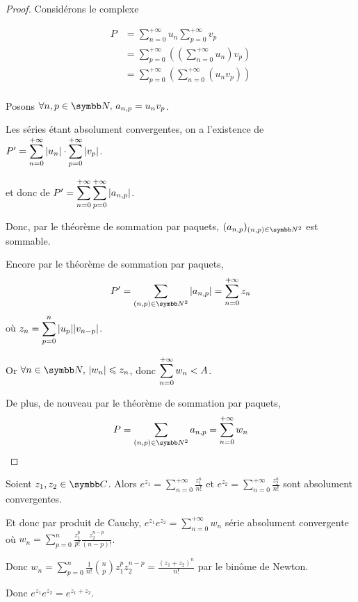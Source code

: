 
\begin{proof}
    Considérons le complexe 

    \begin{align*}
        P & = \sum_{n = 0 }^{+\infty} u_n \sum_{p = 0 }^{+\infty} v_p \\
            & = \sum_{p = 0 }^{+\infty} \left( \left( \sum_{n = 0}^{+\infty} u_n \right) v_p \right) \\
            & = \sum_{p = 0 }^{+\infty} \left( \sum_{n = 0}^{+\infty} (u_n v_p) \right) \\ 
    \end{align*}

    Posons $\forall n, p \in \N, \, a_{n, p} = u_n v_p$.

    Les séries étant absolument convergentes, on a l'existence de 
    $P' = \displaystyle \sum_{n = 0 }^{+\infty} |u_n| \cdot \sum_{p = 0 }^{+\infty} |v_p|$.

    et donc de $P' = \displaystyle \sum_{n = 0 }^{+\infty} \sum_{p = 0 }^{+\infty} |a_{n, p}|$.

    Donc, par le théorème de sommation par paquets, $(a_{n, p})_{(n, p) \in \N^2}$ est sommable. 

    Encore par le théorème de sommation par paquets, 
    \[P' = \sum_{(n, p) \in \N^2} |a_{n, p}| = \sum_{n = 0 }^{+\infty} z_n\]
    où $\displaystyle z_n = \sum_{p = 0}^n |u_p| |v_{n - p}|$.

    Or $\forall n \in \N, \, |w_n| \leqslant z_n$, donc $\displaystyle \sum_{n = 0 }^{+\infty} w_n < A$. 

    De plus, de nouveau par le théorème de sommation par paquets,
    \[P = \sum_{(n, p) \in \N^2} a_{n, p} = \sum_{n = 0 }^{+\infty} w_n\]
\end{proof}

\begin{exemple}
    Soient $z_1, z_2 \in \C$. Alors 
    $\displaystyle e^{z_1} = \sum_{n = 0 }^{+\infty} \frac{z_1^n}{n!}$ et
    $\displaystyle e^{z_2} = \sum_{n = 0 }^{+\infty} \frac{z_2^n}{n!}$ sont absolument convergentes.

    Et donc par produit de Cauchy, $\displaystyle e^{z_1} e^{z_2} = \sum_{n = 0 }^{+\infty} w_n$ 
    série absolument convergente où $\displaystyle w_n = \sum_{ p = 0}^n \frac{z_1^p}{p!} \frac{z_2^{n - p}}{(n - p)!}$.

    Donc $w_n = \displaystyle \sum_{p = 0 }^{n } \frac{1}{n!} \binom n p z_1^p z_2^{n - p} = \frac{(z_1 + z_2)^n}{n!}$ 
    par le binôme de Newton.

    Donc $\displaystyle e^{z_1} e^{z_2} = e^{z_1 + z_2}$.
\end{exemple}

